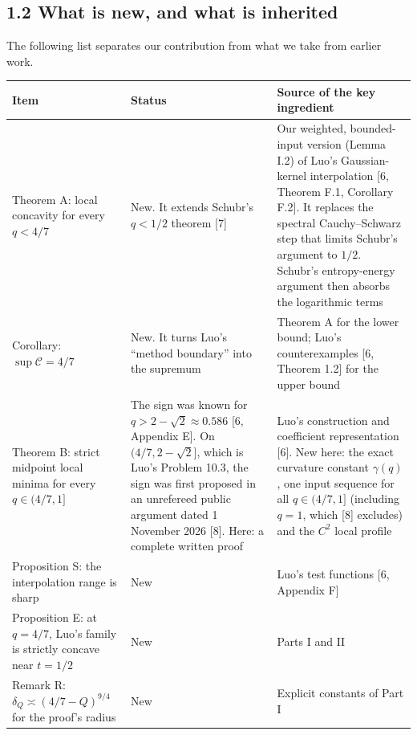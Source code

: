 \documentclass[
  british,
  10pt,
]{article}
\newcounter{none} %
\begin{document}
\subsection{1.2 What is new, and what is
inherited}\label{what-is-new-and-what-is-inherited}

The following list separates our contribution from what we take from
earlier work.

{\def\LTcaptype{none} %
\begin{longtable}[]{@{}
  >{\raggedright\arraybackslash}p{}
  >{\raggedright\arraybackslash}p{}
  >{\raggedright\arraybackslash}p{}@{}}
\toprule\noalign{}
\begin{minipage}[b]{\linewidth}\raggedright
Item
\end{minipage} & \begin{minipage}[b]{\linewidth}\raggedright
Status
\end{minipage} & \begin{minipage}[b]{\linewidth}\raggedright
Source of the key ingredient
\end{minipage} \\
\midrule\noalign{}
\endhead
\bottomrule\noalign{}
\endlastfoot
Theorem A: local concavity for every \(q<4/7\) & New. It extends
Schubr's \(q<1/2\) theorem {[}7{]} & Our weighted, bounded-input version
(Lemma I.2) of Luo's Gaussian-kernel interpolation {[}6, Theorem F.1,
Corollary F.2{]}. It replaces the spectral Cauchy--Schwarz step that
limits Schubr's argument to \(1/2\). Schubr's entropy-energy argument
then absorbs the logarithmic terms \\
Corollary: \(\sup\mathcal C=4/7\) & New. It turns Luo's ``method
boundary'' into the supremum & Theorem A for the lower bound; Luo's
counterexamples {[}6, Theorem 1.2{]} for the upper bound \\
Theorem B: strict midpoint local minima for every \(q\in(4/7,1]\) & The
sign was known for \(q>2-\sqrt2\approx0.586\) {[}6, Appendix E{]}. On
\((4/7,2-\sqrt2]\), which is Luo's Problem 10.3, the sign was first
proposed in an unrefereed public argument dated 1 November 2026 {[}8{]}.
Here: a complete written proof & Luo's construction and coefficient
representation {[}6{]}. New here: the exact curvature constant
\(\gamma(q)\), one input sequence for all \(q\in(4/7,1]\) (including
\(q=1\), which {[}8{]} excludes) and the \(C^2\) local profile \\
Proposition S: the interpolation range is sharp & New & Luo's test
functions {[}6, Appendix F{]} \\
Proposition E: at \(q=4/7\), Luo's family is strictly concave near
\(t=1/2\) & New & Parts I and II \\
Remark R: \(\delta_Q\asymp(4/7-Q)^{9/4}\) for the proof's radius & New &
Explicit constants of Part I \\
\end{longtable}
}
\end{document}

